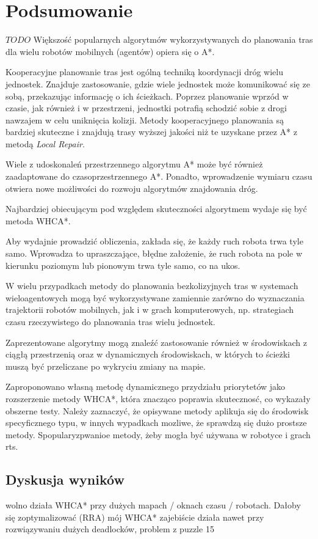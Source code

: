 \chapter{Podsumowanie}
\label{ch:podsumowanie}

$TODO$
Większość popularnych algorytmów wykorzystywanych do planowania tras dla wielu robotów mobilnych (agentów) opiera się o A*.

Kooperacyjne planowanie tras jest ogólną techniką koordynacji dróg wielu jednostek.
Znajduje zastosowanie, gdzie wiele jednostek może komunikować się ze sobą, przekazując informację o ich ścieżkach.
Poprzez planowanie wprzód w czasie, jak również i w przestrzeni, jednostki potrafią schodzić sobie z drogi nawzajem w celu uniknięcia kolizji.
Metody kooperacyjnego planowania są bardziej skuteczne i znajdują trasy wyższej jakości niż te uzyskane przez A* z metodą {\it Local Repair}.

Wiele z udoskonaleń przestrzennego algorytmu A* może być również zaadaptowane do czasoprzestrzennego A*.
Ponadto, wprowadzenie wymiaru czasu otwiera nowe możliwości do rozwoju algorytmów znajdowania dróg.

Najbardziej obiecującym pod względem skuteczności algorytmem wydaje się być metoda WHCA*.

Aby wydajnie prowadzić obliczenia, zakłada się, że każdy ruch robota trwa tyle samo. 
Wprowadza to upraszczające, błędne założenie, że ruch robota na pole w kierunku poziomym lub pionowym trwa tyle samo, co na ukos.

W wielu przypadkach metody do planowania bezkolizyjnych tras w systemach wieloagentowych mogą być wykorzystywane zamiennie zarówno do wyznaczania trajektorii robotów mobilnych, jak i w grach komputerowych, np. strategiach czasu rzeczywistego do planowania tras wielu jednostek.

Zaprezentowane algorytmy mogą znaleźć zastosowanie również w środowiskach z ciągłą przestrzenią oraz w dynamicznych środowiskach, w których to ścieżki muszą być przeliczane po wykryciu zmiany na mapie.

Zaproponowano własną metodę dynamicznego przydziału priorytetów jako rozszerzenie metody WHCA*, która znacząco poprawia skutecznosć, co wykazały obszerne testy.
Należy zaznaczyć, że opisywane metody aplikuja się do środowisk specyficznego typu, w innych wypadkach mozliwe, że sprawdzą się dużo prostsze metody.
Spopularyzpwanioe metody, żeby mogła być używana w robotyce i grach rts.

\section{Dyskusja wyników}

wolno działa WHCA* przy dużych mapach / oknach czasu / robotach. Dałoby się zoptymalizować (RRA)
mój WHCA* zajebiście działa nawet przy rozwiązywaniu dużych deadlocków, problem z puzzle 15